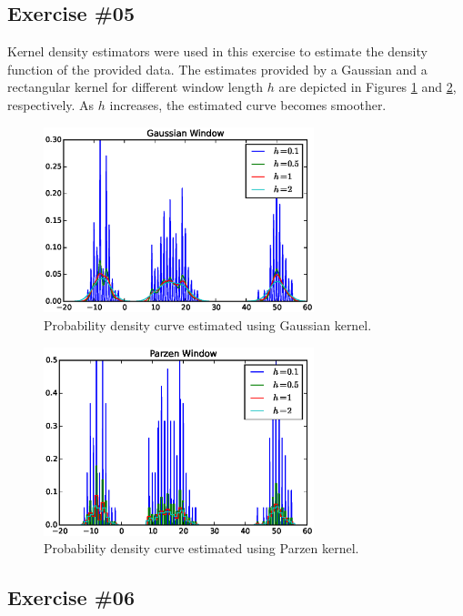 \documentclass[a4paper,12pt]{article}
\begin{document}
\subsection*{Exercise \#05}
Kernel density estimators were used in this exercise to estimate the density function of the provided data. The estimates provided by a Gaussian and a rectangular kernel for different window length $h$ are depicted in Figures \ref{fig:5f1} and \ref{fig:5f2}, respectively. As $h$ increases, the estimated curve becomes smoother. 
\begin{figure}[htb]
 \centering
 \includegraphics[width=0.7\textwidth]{./figures/5f1.eps}
 \caption{Probability density curve estimated using Gaussian kernel.}
 \label{fig:5f1}
\end{figure}
\begin{figure}[htb]
 \centering
 \includegraphics[width=0.7\textwidth]{./figures/5f2.eps}
 \caption{Probability density curve estimated using Parzen kernel.}
 \label{fig:5f2}
\end{figure}

\cleardoublepage
\subsection*{Exercise \#06}
\end{document}
